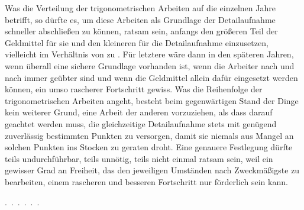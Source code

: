Was die Verteilung der trigonometrischen Arbeiten auf die einzelnen Jahre
betrifft, so dürfte es, um diese Arbeiten als Grundlage der Detailaufnahme
schneller abschließen zu können, ratsam sein, anfangs den größeren Teil der
Geldmittel für sie und den kleineren für die Detailaufnahme einzusetzen,
vielleicht im Verhältnis von  zu . Für letztere
wäre dann in den späteren Jahren, wenn überall eine sichere Grundlage
vorhanden ist, wenn die Arbeiter nach und nach immer geübter sind und wenn
die Geldmittel allein dafür eingesetzt werden können, ein umso rascherer
Fortschritt gewiss. Was die Reihenfolge der trigonometrischen Arbeiten angeht,
besteht beim gegenwärtigen Stand der Dinge kein weiterer Grund, eine Arbeit
der anderen vorzuziehen, als dass darauf geachtet werden muss, die
gleichzeitige Detailaufnahme stets mit genügend zuverlässig bestimmten
Punkten zu versorgen, damit sie niemals aus Mangel an solchen Punkten ins
Stocken zu geraten droht. Eine genauere Festlegung dürfte
 teils undurchführbar, teils unnötig, teils nicht
einmal ratsam sein, weil ein gewisser Grad an Freiheit, das den jeweiligen
Umständen nach Zweckmäßigste zu bearbeiten, einem rascheren und besseren
Fortschritt nur förderlich sein kann.
\par\noindent\mbox{.\ .\ .\ .\ .\ .}\par
\medskip\noindent\hspace*{0.03\linewidth}{\footnotesize IX.}\hfill{}\par
